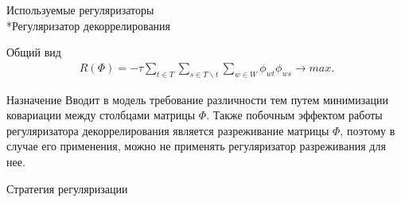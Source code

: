 \documentclass{beamer}
\begin{document}
\begin{frame}{Используемые регуляризаторы \\*Регуляризатор декоррелирования}
\begin{block}{Общий вид}
\begin{align*}
R(\Phi)=-\tau \sum_{t \in T}\sum_{s \in T\backslash t}\sum_{w \in W} \phi_{wt}\phi_{ws} \to max.
\end{align*} 
    \end{block}
\begin{block}{Назначение}
Вводит в модель требование различности тем путем минимизации ковариации между столбцами матрицы $\Phi$. Также побочным эффектом работы регуляризатора декоррелирования является разреживание матрицы $\Phi$, поэтому в случае его применения, можно не применять регуляризатор разреживания для нее.
    \end{block}
\end{frame}
\begin{frame}{Стратегия регуляризации}
\end{frame}
\end{document}
